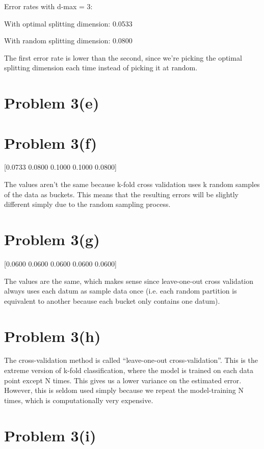 \documentclass{article}
\begin{document}
Error rates with d-max = 3:

With optimal splitting dimension: 0.0533

With random splitting dimension: 0.0800

The first error rate is lower than the second, since we're picking the optimal splitting dimension each time instead of picking it at random.

\section*{Problem 3(e)}


\section*{Problem 3(f)}

[0.0733    0.0800    0.1000    0.1000    0.0800]

The values aren't the same because k-fold cross validation uses k random samples of the data as buckets. This means that the resulting errors will be slightly different simply due to the random sampling process.

\section*{Problem 3(g)}

[0.0600    0.0600    0.0600    0.0600    0.0600]

The values are the same, which makes sense since leave-one-out cross validation always uses each datum as sample data once (i.e. each random partition is equivalent to another because each bucket only contains one datum).

\section*{Problem 3(h)}

The cross-validation method is called ``leave-one-out cross-validation''. This is the extreme version of k-fold classification, where the model is trained on each data point except N times. This gives us a lower variance on the estimated error. However, this is seldom used simply because we repeat the model-training N times, which is computationally very expensive.

\section*{Problem 3(i)}
\end{document}
